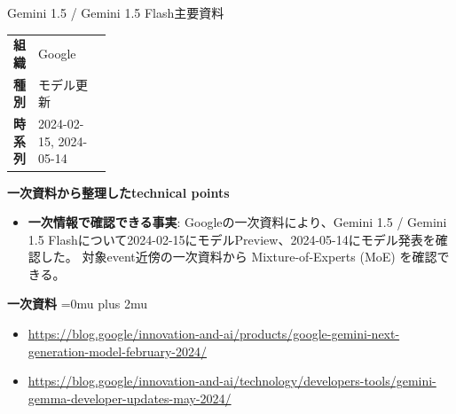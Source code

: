 \begin{technicalnote}{Gemini 1.5 / Gemini 1.5 Flash}{主要資料}
\begingroup
\begin{tabularx}{\linewidth}{@{}>{\bfseries}p{0.22\linewidth}X@{}}
組織 & Google \\
種別 & モデル更新 \\
時系列 & 2024-02-15, 2024-05-14 \\
\end{tabularx}
\smallskip
\begin{minipage}{\linewidth}
{\bfseries 一次資料から整理したtechnical points}
\begin{itemize}[leftmargin=1.5em,itemsep=0.35em]
\item \textbf{一次情報で確認できる事実}: Googleの一次資料により、Gemini 1.5 / Gemini 1.5 Flashについて2024-02-15にモデルPreview、2024-05-14にモデル発表を確認した。 対象event近傍の一次資料から Mixture-of-Experts (MoE) を確認できる。
\end{itemize}
\begin{minipage}{\linewidth}
\begin{samepage}
{\bfseries 一次資料}
\begingroup\sloppy
\Urlmuskip=0mu plus 2mu\relax
\begin{itemize}[leftmargin=1.5em,itemsep=0.25em]
\item {\scriptsize\url{https://blog.google/innovation-and-ai/products/google-gemini-next-generation-model-february-2024/}}
\item {\scriptsize\url{https://blog.google/innovation-and-ai/technology/developers-tools/gemini-gemma-developer-updates-may-2024/}}
\end{itemize}
\endgroup
\end{samepage}
\end{minipage}
\end{minipage}
\endgroup
\end{technicalnote}
\medskip

